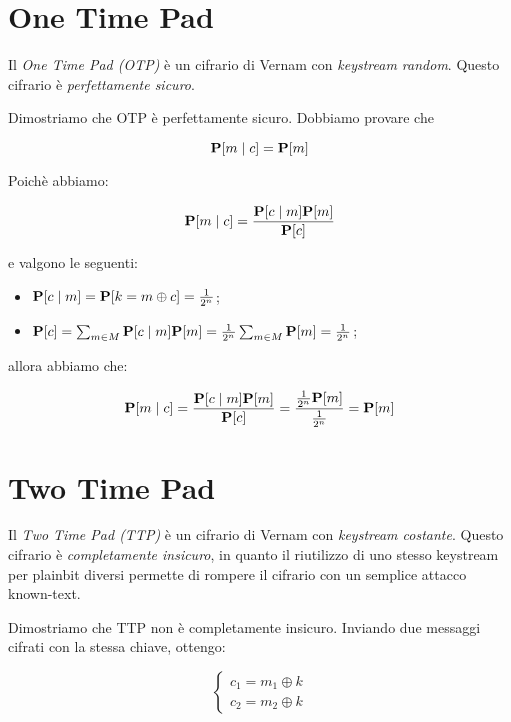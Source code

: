 \section{One Time Pad}
Il \textit{One Time Pad (OTP)} è un cifrario di Vernam con \textit{keystream random}. Questo cifrario è \textit{perfettamente sicuro}.

Dimostriamo che OTP è perfettamente sicuro.
Dobbiamo provare che 

\begin{equation*}
\mathbf{P}[m \mid c]=\mathbf{P}[m]
\end{equation*}

Poichè abbiamo:

\begin{equation*}
\mathbf{P}[m \mid c]=\frac{\mathbf{P}[c \mid m]\mathbf{P}[m]}{\mathbf{P}[c]}
\end{equation*}

e valgono le seguenti:

\begin{itemize}
	\item $\mathbf{P}[c \mid m]=\mathbf{P}[k=m \oplus c]=\frac{1}{2^{n}}$;
	
	\item $\mathbf{P}[c]=\sum_{m \in M}\mathbf{P}[c \mid m]\mathbf{P}[m]=\frac{1}{2^{n}}\sum_{m\in M}\mathbf{P}[m]=\frac{1}{2^{n}}$;
\end{itemize}

allora abbiamo che:

\begin{equation*}
\mathbf{P}[m \mid c]=\frac{\mathbf{P}[c \mid m]\mathbf{P}[m]}{\mathbf{P}[c]}=\frac{\frac{1}{2^{n}}\mathbf{P}[m]}{\frac{1}{2^{n}}}=\mathbf{P}[m]
\end{equation*}


\section{Two Time Pad}
Il \textit{Two Time Pad (TTP)} è un cifrario di Vernam con \textit{keystream costante}. Questo cifrario è \textit{completamente insicuro}, in quanto il riutilizzo di uno stesso keystream per plainbit diversi permette di rompere il cifrario con un semplice attacco known-text.

Dimostriamo che TTP non è completamente insicuro.
Inviando due messaggi cifrati con la stessa chiave, ottengo:

\begin{equation*}
\begin{cases}
c_{1}=m_{1} \oplus k \\
c_{2}=m_{2} \oplus k
\end{cases}
\end{equation*}

